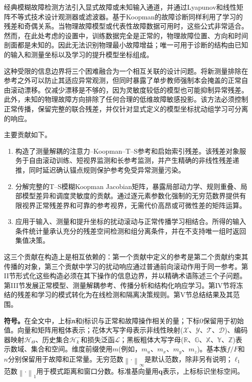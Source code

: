 \documentclass[journal]{IEEEtran}
\newcommand{\norm}[1]{\left\lVert #1\right\rVert}
\newcommand{\1}{\bm 1}
\begin{document}
经典模糊故障检测方法引入显式故障或未知输入通道，并通过Lyapunov和线性矩阵不等式技术设计观测器或滤波器\cite{nguang2007,yang2011,thumati2014,zhao2020,ran2022}。基于Koopman的故障诊断同样利用了学习的残差和奇偶关系\cite{bakhtiaridoust2023,irani2024}。当物理故障模型或代表性故障数据可用时，这些公式非常适合。然而，在此处考虑的设置中，训练数据完全是正常的，物理故障位置、方向和时间剖面都是未知的。因此无法识别物理最小故障增益；唯一可用于诊断的结构由已知的输入和测量坐标以及学习的提升模型坐标组成。

这种受限的信息边界将三个困难融合为一个相互关联的设计问题。将新测量排除在参考之外可以防止其适应异常观测，但同时暴露了单步教师强制本会掩盖的正常自由滚动漂移。仅减少漂移是不够的，因为灵敏度较低的模型也可能抑制异常残差。此外，未知的物理故障方向排除了任何合理的低维故障敏感投影。该方法必须控制正常传播，保留完整的联合残差，并仅针对显式定义的模型坐标扰动组学习可分离的响应。

主要贡献如下。
\begin{enumerate}
\item 构造了测量解耦的注意力--Koopman--T--S参考和启始索引残差。该残差对象服务于自由滚动训练、短视界监测和长参考监测，并产生精确的非线性残差递推，同时延迟确认锚点规则保护参考免受异常测量污染。

\item 分解完整的T--S模糊Koopman Jacobian矩阵，暴露局部动力学、规则重叠、局部模型差异和调度灵敏度的贡献。通过逐元素参数化强制的无穷范数界提供有限视界正常残差界和可靠的参考视界，无需代价高昂或可微性差的矩阵运算。

\item 应用于输入、测量和提升坐标的扰动滚动与正常传播学习相结合。所得的输入条件统计量承认充分的残差空间检测和组分离条件，并在不支持唯一组时返回集值决策。
\end{enumerate}

这三个贡献在构造上是相互依赖的：第一个贡献中定义的参考是第二个贡献约束其传播的对象，第三个贡献中学习的扰动响应通过普通前向滚动作用于同一参考。第II节形式化这些构造必须在其下操作的信息边界，并以精确术语陈述三个子问题。第III节发展正常模型、测量解耦参考、传播分析和结构化响应学习。第IV节将冻结的残差和学习的模式转化为在线检测和隔离决策规则。第V节总结结果及其范围。

\textbf{符号。}在全文中，上标$\mathfrak n$和$\mathfrak f$标识与正常和故障操作相关的量；下标$0$保留用于初始值。向量和矩阵用粗体表示；花体大写字母表示非线性映射($\mathcal X$、$\mathcal Y$、$\mathcal T$、$\mathcal D$)、编码器映射$\mathcal H_\Theta$、历史集合$\mathcal H_k^-$和损失泛函$\mathcal L$；黑板粗体大写字母($\mathbb R$、$\mathbb G$、$\mathbb X$、$\mathbb Y$、$\mathbb Z$)表示数域、集合和空间。维度前缀使用$m$(例如，$m_u$、$m_x$、$m_y$、$m_z$)。基本族$f/F$和$n$分别保留用于故障和正常量。无穷范数$\norm{\cdot}_\infty$是默认范数，除非另有说明；$\ell_1$范数$\norm{\cdot}_1$用于模式距离和窗口分数。标准基向量用$\bm q$表示，上标标识坐标空间。
\end{document}

